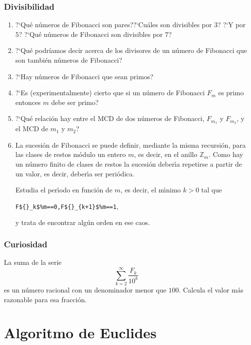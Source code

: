 \subsubsection{Divisibilidad}
\begin{ejer}
\begin{enumerate}
\item?`Qu\'e n\'umeros de Fibonacci son pares??`Cu\'ales son divisibles por $3$?
?`Y por $5$? ?`Qu\'e n\'umeros de Fibonacci son divisibles por $7$?

\item ?`Qu\'e podr\'{i}amos decir acerca de los divisores de un n\'umero de
Fibonacci que son tambi\'en n\'umeros de Fibonacci? 

\item ?`Hay n\'umeros de Fibonacci que sean primos?

\item?`Es (experimentalmente) cierto que si un n\'umero de Fibonacci $F_m$  es
primo entonces $m$ debe ser primo?

\item ?`Qu\'e relaci\'on hay entre el MCD de dos n\'umeros de Fibonacci,
$F_{m_1}$ y
$F_{m_2}$,  y el MCD de $m_1$ y $m_2$?

\item La sucesi\'on de Fibonacci se puede definir, mediante la misma
recursi\'on,  para las clases de restos m\'odulo un entero $m$, es decir, en el
anillo $\mathbb{Z}_m$. Como hay un n\'umero finito de clases de restos la
sucesi\'on deber\'{\i}a repetirse a partir de un valor, es decir, deber\'{\i}a
ser peri\'odica. 

Estudia el per\'{\i}odo en funci\'on de $m$, es decir, el m\'{\i}nimo $k>0$ tal
que 
\begin{center}
\lstinline|F${}_k$%m==0,F${}_{k+1}$%m==1|,
\end{center}
\noindent y trata de encontrar alg\'un orden en ese caos.
\end{enumerate}
\end{ejer}
\subsubsection{Curiosidad}
\begin{ejer}
La suma de la serie 
\[\sum_{k=2}^{\infty}\frac{F_k}{10^k}\]
\noindent es un n\'umero racional con un denominador menor que $100$. Calcula el
valor m\'as razonable para esa fracci\'on. 
\end{ejer}

\section{Algoritmo de Euclides}\label{eucl}

